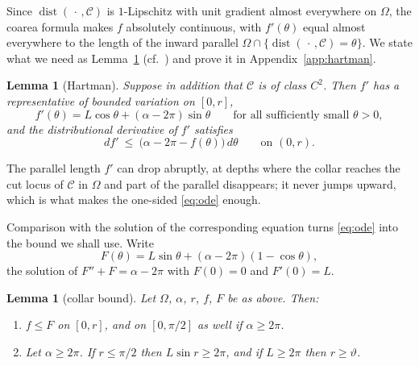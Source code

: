 \documentclass[11pt,oneside,reqno]{amsart}
\theoremstyle{plain}
\newtheorem{lemma}[theorem]{Lemma}
\theoremstyle{definition}
\DeclareMathOperator{\dist}{dist}
\begin{document}
Since $\dist(\,\cdot\,,\mathcal{C})$ is $1$-Lipschitz with unit gradient almost
everywhere on $\Omega$, the coarea formula makes $f$ absolutely continuous, with
$f'(\theta)$ equal almost everywhere to the length of the inward parallel
$\Omega\cap\{\dist(\,\cdot\,,\mathcal{C})=\theta\}$. We state what we need as
Lemma~\ref{lem:parallel} (cf.\ \cite{Hartman64}) and prove it in
Appendix~\ref{app:hartman}.

\begin{lemma}[Hartman]\label{lem:parallel}
Suppose in addition that $\mathcal{C}$ is of class $C^{2}$. Then $f'$ has a
representative of bounded variation on $[0,r]$,
\begin{equation}\label{eq:fprime}
  f'(\theta)=L\cos\theta+(\alpha-2\pi)\sin\theta
  \qquad\text{for all sufficiently small }\theta>0,
\end{equation}
and the distributional derivative of $f'$ satisfies
\begin{equation}\label{eq:ode}
  df'\ \le\ \bigl(\alpha-2\pi-f(\theta)\bigr)\,d\theta
  \qquad\text{on }(0,r).
\end{equation}
\end{lemma}

The parallel length $f'$ can drop abruptly, at depths where the collar reaches
the cut locus of $\mathcal{C}$ in $\Omega$ and part of the parallel disappears;
it never jumps upward, which is what makes the one-sided \eqref{eq:ode} enough.

Comparison with the solution of the corresponding equation turns \eqref{eq:ode}
into the bound we shall use. Write
\begin{equation}\label{eq:F}
  F(\theta)=L\sin\theta+(\alpha-2\pi)(1-\cos\theta),
\end{equation}
the solution of $F''+F=\alpha-2\pi$ with $F(0)=0$ and $F'(0)=L$.

\begin{lemma}[collar bound]\label{lem:collar}
Let $\Omega$, $\alpha$, $r$, $f$, $F$ be as above. Then:
\begin{enumerate}
\item[(a)] $f\le F$ on $[0,r]$, and on $[0,\pi/2]$ as well if $\alpha\ge2\pi$.
\item[(b)] Let $\alpha\ge2\pi$. If $r\le\pi/2$ then $L\sin r\ge2\pi$, and if
  $L\ge2\pi$ then $r\ge\vartheta$.
\end{enumerate}
\end{lemma}
\end{document}
